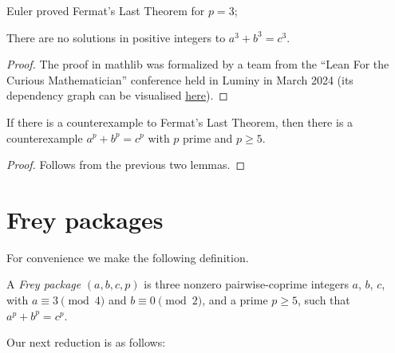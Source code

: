 Euler proved Fermat's Last Theorem for $p=3$;

\begin{lemma}\label{fermatLastTheoremThree}\leanok
{}
  There are no solutions in positive integers to $a^3+b^3=c^3$.
\end{lemma}
\begin{proof}
  \leanok
  The proof in mathlib was formalized by a team from the ``Lean For the Curious Mathematician'' conference held in Luminy in March 2024
  (its dependency graph can be visualised \href{https://pitmonticone.github.io/FLT3/blueprint/dep_graph_document.html}{\underline{here}}).
\end{proof}

\begin{corollary}\label{FLT.of_p_ge_5}\leanok If there is a counterexample to
  Fermat's Last Theorem, then there is a counterexample $a^p+b^p=c^p$ with $p$ prime and $p\geq 5$.
\end{corollary}
\begin{proof}\leanok Follows from the
  previous two lemmas.\end{proof}

\section{Frey packages}

For convenience we make the following definition.

\begin{definition}\label{FLT.FreyPackage}\leanok A \emph{Frey package} $(a,b,c,p)$
is three nonzero pairwise-coprime integers $a$, $b$, $c$, with $a\equiv3\pmod4$ and $b\equiv0\pmod2$,
and a prime $p\geq5$, such that $a^p+b^p=c^p$.\end{definition}

Our next reduction is as follows:

